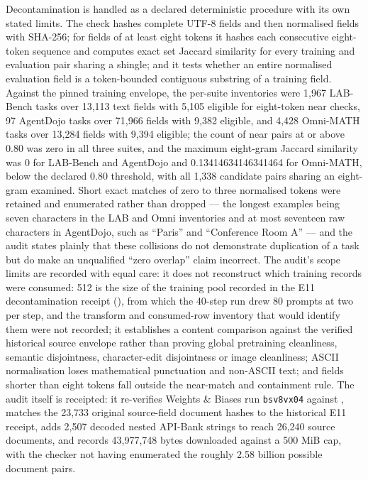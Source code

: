 \documentclass[12pt,a4paper]{report}
\newcommand{\longtok}[1]{\texttt{\seqsplit{#1}}}
\begin{document}
Decontamination is handled as a declared deterministic procedure with
its own stated limits. The check hashes complete UTF-8 fields and then
normalised fields with SHA-256; for fields of at least eight tokens it
hashes each consecutive eight-token sequence and computes exact set
Jaccard similarity for every training and evaluation pair sharing a
shingle; and it tests whether an entire normalised evaluation field is a
token-bounded contiguous substring of a training field. Against the
pinned training envelope, the per-suite inventories were 1,967 LAB-Bench
tasks over 13,113 text fields with 5,105 eligible for eight-token near
checks, 97 AgentDojo tasks over 71,966 fields with 9,382 eligible, and
4,428 Omni-MATH tasks over 13,284 fields with 9,394 eligible; the count
of near pairs at or above 0.80 was zero in all three suites, and the
maximum eight-gram Jaccard similarity was 0 for LAB-Bench and AgentDojo
and 0.13414634146341464 for Omni-MATH, below the declared 0.80
threshold, with all 1,338 candidate pairs sharing an eight-gram
examined. Short exact matches of zero to three normalised tokens were
retained and enumerated rather than dropped --- the longest examples
being seven characters in the LAB and Omni inventories and at most
seventeen raw characters in AgentDojo, such as ``Paris'' and
``Conference Room A'' --- and the audit states plainly that these
collisions do not demonstrate duplication of a task but do make an
unqualified ``zero overlap'' claim incorrect. The audit's scope limits
are recorded with equal care: it does not reconstruct which training
records were consumed: 512 is the size of the training pool recorded in
the E11 decontamination receipt
(\longtok{selected\_\allowbreak{}training\_\allowbreak{}row\_\allowbreak{}count}), from which the 40-step run
drew 80 prompts at two per step, and the transform and consumed-row
inventory that would identify them were not recorded; it establishes a
content comparison against the verified historical source envelope
rather than proving global pretraining cleanliness, semantic
disjointness, character-edit disjointness or image cleanliness; ASCII
normalisation loses mathematical punctuation and non-ASCII text; and
fields shorter than eight tokens fall outside the near-match and
containment rule. The audit itself is receipted: it re-verifies Weights
\& Biases run \texttt{bsv8vx04} against
\longtok{training\_\allowbreak{}identity\_\allowbreak{}verified.json}, matches the 23,733 original
source-field document hashes to the historical E11 receipt, adds 2,507
decoded nested API-Bank strings to reach 26,240 source documents, and
records 43,977,748 bytes downloaded against a 500 MiB cap, with the
checker not having enumerated the roughly 2.58 billion possible document
pairs.
\end{document}

